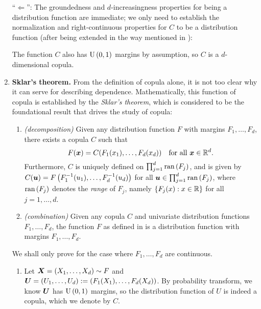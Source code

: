 \begin{enumerate}
\begin{pf}
``\(\Leftarrow\)'': The groundedness and \(d\)-increasingness properties for
being a distribution function are immediate; we only need to establish the
normalization and right-continuous properties for \(C\) to be a distribution
function (after being extended in the way mentioned in ):
The function \(C\) also has \(\operatorname{U}\left(0,1\right)\) margins by assumption, so \(C\) is
a \(d\)-dimensional copula.
\end{pf}
\item \textbf{Sklar's theorem.} From the definition of copula alone, it is not
too clear why it can serve for describing dependence. Mathematically, this
function of copula is established by the \emph{Sklar's theorem}, which is
considered to be the foundational result that drives the study of copula:
\begin{theorem}
\label{thm:sklar}
\hfill
\begin{enumerate}
\item \emph{(decomposition)} Given any distribution function \(F\) with margins \(F_1,\dotsc,F_d\),
there exists a copula \(C\) such that
\begin{equation}
\label{eq:copula-link}
F(\bm{x})=C(F_1(x_1),\dotsc,F_d(x_d))\quad\text{for all \(\bm{x}\in\mathbb{R}^d\)}.
\end{equation}
Furthermore, \(C\) is uniquely defined on \(\prod_{j=1}^{d}\operatorname{ran}\left(F_j\right)\), and is
given by \(C(\bm{u})=F\left(F_1^{-1}(u_1),\dotsc,F_d^{-1}(u_d)\right)\) for all
\(\bm{u}\in\prod_{j=1}^{d}\operatorname{ran}\left(F_j\right)\), where \(\operatorname{ran}\left(F_j\right)\) denotes the
\emph{range} of \(F_j\), namely \(\{F_j(x):x\in\mathbb{R}\}\) for all \(j=1,\dotsc,d\).
\item \emph{(combination)} Given any copula \(C\) and univariate distribution
functions \(F_1,\dotsc,F_d\), the function \(F\) as defined in
 is a distribution function with margins
\(F_1,\dotsc,F_d\).
\end{enumerate}
\end{theorem}
\begin{pf}
We shall only prove for the case where \(F_1,\dotsc,F_d\) are continuous.
\begin{enumerate}
\item Let \(\bm{X}=(X_1,\dotsc,X_d)\sim F\) and
\(\bm{U}=(U_1,\dotsc,U_d):=(F_1(X_1),\dotsc,F_d(X_d))\). By probability transform, we know
\(\bm{U}\) has \(\operatorname{U}\left(0,1\right)\) margins, so the distribution function of \(U\)
is indeed a copula, which we denote by \(C\).


\end{enumerate}
\end{pf}
\end{enumerate}
